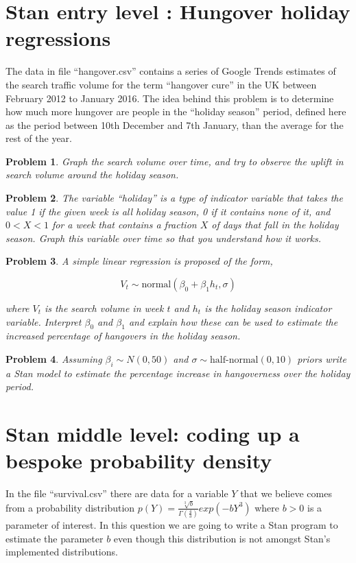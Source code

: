 \documentclass{article}
\newtheorem{problem}{Problem}[section]
\begin{document}
\section{Stan entry level : Hungover holiday regressions}
The data in file ``hangover.csv'' contains a series of Google Trends estimates of the search traffic volume for the term ``hangover cure'' in the UK between February 2012 to January 2016. The idea behind this problem is to determine how much more hungover are people in the ``holiday season'' period, defined here as the period between 10th December and 7th January, than the average for the rest of the year.

\begin{problem}
	Graph the search volume over time, and try to observe the uplift in search volume around the holiday season.
\end{problem}

\begin{problem}
The variable ``holiday'' is a type of indicator variable that takes the value 1 if the given week is \textit{all} holiday season, 0 if it contains none of it, and $0<X<1$ for a week that contains a fraction $X$ of days that fall in the holiday season. Graph this variable over time so that you understand how it works.
\end{problem}

\begin{problem}
A simple linear regression is proposed of the form,

\begin{equation}
V_t\sim \text{normal}(\beta_0+\beta_1 h_t,\sigma)
\end{equation}

where $V_t$ is the search volume in week $t$ and $h_t$ is the holiday season indicator variable. Interpret $\beta_0$ and $\beta_1$ and explain how these can be used to estimate the increased percentage of hangovers in the holiday season.
\end{problem}

\begin{problem}
Assuming $\beta_i\sim N(0,50)$ and $\sigma\sim \text{half-normal}(0,10)$ priors write a Stan model to estimate the percentage increase in hangoverness over the holiday period.
\end{problem}

\section{Stan middle level: coding up a bespoke probability density}
In the file ``survival.csv'' there are data for a variable $Y$ that we believe comes from a probability distribution $p(Y) =\frac{\sqrt[3]{b}}{\Gamma\left(\frac{4}{3}\right)} exp(-b Y^3)$ where $b>0$ is a parameter of interest. In this question we are going to write a Stan program to estimate the parameter $b$ even though this distribution is not amongst Stan's implemented distributions.
\end{document}
